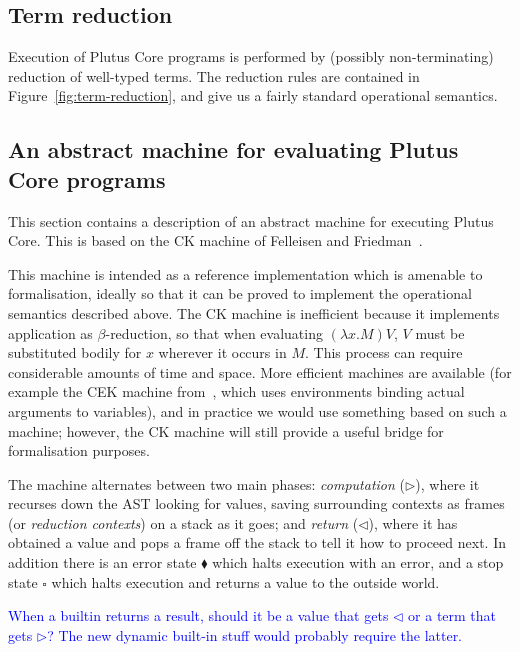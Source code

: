\documentclass[a4paper]{article}
\newcommand{\blue}[1]{\textcolor{blue}{#1}}
\begin{document}
\subsection{Term reduction}
Execution of Plutus Core programs is performed by (possibly
non-terminating) reduction of well-typed terms.  The reduction rules
are contained in Figure~\ref{fig:term-reduction}, and give us a fairly
standard operational semantics.



\subsection{An abstract machine for evaluating Plutus Core programs}
This section contains a description of an abstract machine for
executing Plutus Core.  This is based on the CK machine of Felleisen
and Friedman~\cite{Felleisen-CK-CEK}. 

This machine is intended as a reference implementation which is
amenable to formalisation, ideally so that it can be proved to
implement the operational semantics described above.  The CK machine
is inefficient because it implements application as $\beta$-reduction,
so that when evaluating $(\lambda x.M)V$, $V$ must be substituted
bodily for $x$ wherever it occurs in $M$.  This process can require
considerable amounts of time and space.  More efficient machines are
available (for example the CEK machine from~\cite{Felleisen-CK-CEK},
which uses environments binding actual arguments to variables), and in
practice we would use something based on such a machine; however, the
CK machine will still provide a useful bridge for formalisation
purposes.



\noindent The machine alternates between two main phases: \textit{computation}
($\triangleright$), where it recurses down the AST looking for values,
saving surrounding contexts as frames (or \textit{reduction contexts})
on a stack as it goes; and \textit{return} ($\triangleleft$), where it
has obtained a value and pops a frame off the stack to tell it how to
proceed next.  In addition there is an error state $\blacklozenge$
which halts execution with an error, and a stop state $\square$ which
halts execution and returns a value to the outside world.

\blue{When a builtin returns a result, should it be a value
  that gets $\triangleleft$ or a term that gets $\triangleright$?  The 
  new dynamic built-in stuff would probably require the latter.} 
\end{document}

